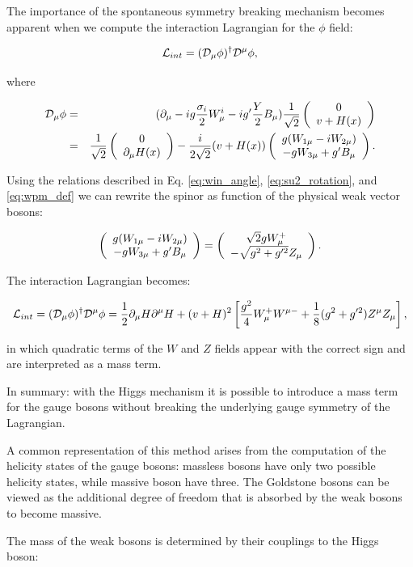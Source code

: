 The importance of the spontaneous symmetry breaking mechanism becomes apparent when we compute the interaction Lagrangian for the $\phi$ field:

\begin{equation}
\mathcal{L}_{int} = (\mathcal{D}_\mu\phi)^\dagger\mathcal{D}^\mu\phi,
\end{equation}

where

\begin{eqnarray}
\mathcal{D}_\mu \phi &=& (\partial_\mu - ig\dfrac{\sigma_i}{2}W^i_\mu - ig'\dfrac{Y}{2}B_\mu) \dfrac{1}{\sqrt{2}} \left(\begin{array}{c}0 \\v+H(x)\end{array}\right) \nonumber \\
&=& \dfrac{1}{\sqrt{2}} \left(\begin{array}{c}0 \\\partial_\mu H(x)\end{array}\right) - \dfrac{i}{2\sqrt{2}} (v+H(x)) \left(\begin{array}{c}g(W_{1\mu} - i W_{2\mu}) \\-g W_{3\mu} + g'B_\mu\end{array}\right).
\end{eqnarray}

Using the relations described in Eq. \ref{eq:win_angle}, \ref{eq:su2_rotation}, and \ref{eq:wpm_def} we can rewrite the spinor as function of the physical weak vector bosons:

\begin{equation}
\left(\begin{array}{c}g(W_{1\mu} - i W_{2\mu}) \\-g W_{3\mu} + g'B_\mu\end{array}\right) = \left(\begin{array}{c}\sqrt{2} g W^+_{\mu} \\-\sqrt{g^2+g'^2}Z_\mu\end{array}\right).
\end{equation}

The interaction Lagrangian becomes:

\begin{equation}
\mathcal{L}_{int} = (\mathcal{D}_\mu\phi)^\dagger\mathcal{D}^\mu\phi = \frac{1}{2}\partial_{\mu}H\partial^{\mu}H+(v+H)^2\left[\frac{g^2}{4}W^+_{\mu}W^{\mu-} + \frac{1}{8}(g^2+g'^2) Z^{\mu}Z_{\mu}\right ],
\end{equation}

in which quadratic terms of the $W$ and $Z$ fields appear with the correct sign and are interpreted as a mass term. 

In summary: with the Higgs mechanism it is possible to introduce a mass term for the gauge bosons without breaking the underlying gauge symmetry of the Lagrangian. 

A common representation of this method arises from the computation of the helicity states of the gauge bosons: massless bosons have only two possible helicity states, while massive boson have three. The Goldstone bosons can be viewed as the additional degree of freedom that is absorbed by the weak bosons to become massive.

The mass of the weak bosons is determined by their couplings to the Higgs boson: 


